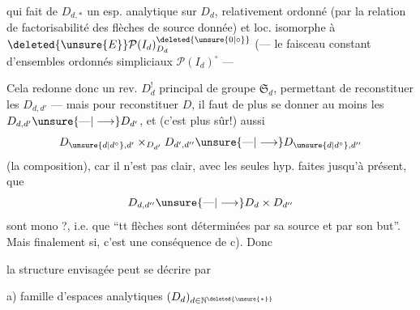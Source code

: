 qui fait de $D_{d,*}$ un esp. analytique sur $D_d$,  relativement ordonné (par la relation de factorisabilité
\diagram{\begin{tikzcd}[ampersand replacement=\&, column sep=small,row sep=small]
{} \& {} \arrow[dd,dotted] \\
\bullet \arrow[ru] \arrow[rd] \& \\
{} \& {}
\end{tikzcd}}
des flèches de source donnée)  et loc. isomorphe à $\deleted{\unsure{E}}\mathcal P(I_d)^{\deleted{\unsure{0|\circ}}}_{D_d}$  (--- le faisceau constant d'ensembles ordonnés simpliciaux $\mathcal P(I_d)^\circ$ ---

Cela redonne donc un rev. $D^!_d$ principal de groupe $\mathfrak S_d$, permettant de reconstituer les $D_{d,d'}$ --- mais pour reconstituer $D$, il faut de plus se donner  au moins les $D_{d,d'}\unsure{\text{---}|\longrightarrow}D_{d'}$, et (c'est plus sûr!) aussi
\[
D_{\unsure{d|d^\circ},d'}\mathbin{\times}_{D_{d'}}D_{d',d''}\unsure{\text{---}|\longrightarrow}D_{\unsure{d|d^\circ},d''}
\]
(la  composition), car il n'est pas clair, avec les seules hyp. faites jusqu'à présent, que  
\[
D_{d,d''}\unsure{\text{---}|\longrightarrow}D_d\times D_{d''}
\]
sont mono ?, i.e. que ``tt flèches sont déterminées par sa source et par son but''. Mais finalement si, c'est une conséquence de c). Donc

la structure envisagée peut se décrire par

a) famille d'espaces analytiques $(D_d)_{d\in\mathbb N^{\deleted{\unsure{*}}}}$

